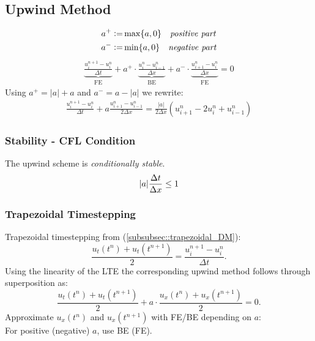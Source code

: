 \subsection{Upwind Method}
    \vspace{-1em}
    \begin{align*}
        a^+ \vcentcolon=& \max\{a,0\} \quad \textit{positive part}\\
        a^- \vcentcolon=& \min\{a,0\} \quad \textit{negative part}\\
    \end{align*}
    \vspace{-2em}
    \begin{align*}
        \underbrace{\frac{u_{i}^{n+1} - u_{i}^{n}}{\Delta t}}_{\textrm{FE}} + a^+ \cdot \underbrace{\frac{u_i^n - u_{i-1}^{n}}{\Delta x}}_{\textrm{BE}} + a^- \cdot \underbrace{\frac{u_{i+1}^n - u_{i}^{n}}{\Delta x}}_{\textrm{FE}} = 0
    \end{align*}
    Using $a^+ = \lvert a \rvert + a$ and $a^- = a - \lvert a \rvert$ we rewrite:
    \vspace{0.25em}
    \begin{align*}
        \!\!\frac{u_{i}^{n+1} - u_{i}^{n}}{\Delta t} + a \frac{u_{i+1}^n - u_{i-1}^{n}}{2\Delta x}
        \! = \! \frac{\lvert a \rvert}{2 \Delta x}\!\! \left( u_{i+1}^n - 2 u_{i}^{n} + u_{i-1}^{n} \right)
    \end{align*}
    \subsubsection{Stability - CFL Condition}
        The upwind scheme is \textit{conditionally stable}.
        $$
            \abs{a} \frac{\Delta t}{\Delta x} \leq 1
        $$
    \subsubsection{Trapezoidal Timestepping}
        Trapezoidal timestepping from (\ref{subsubsec::trapezoidal_DM}):
        $$
            \frac{u_t(t^n) + u_t(t^{n+1})}{2} = \frac{u_i^{n+1} - u_i^n}{\Delta t}.
        $$
        Using the linearity of the LTE the corresponding upwind method follows through superposition as:
        $$
            \frac{u_t(t^n) + u_t(t^{n+1})}{2} + a \cdot  \frac{u_x(t^n) + u_x(t^{n+1})}{2} = 0.
        $$
        Approximate $u_x(t^n)$ and $u_x(t^{n+1})$ with FE/BE depending on $a$:\\
        For positive (negative) $a$, use BE (FE).
    
    

